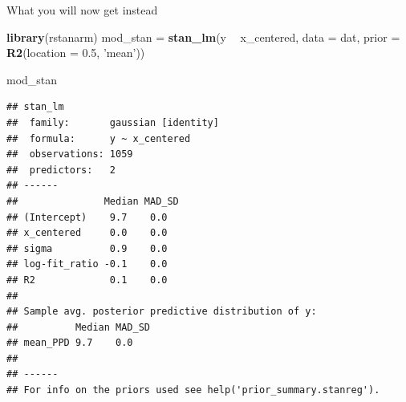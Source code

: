 \documentclass[ignorenonframetext,]{beamer}
\newenvironment{Shaded}{\begin{snugshade}}{\end{snugshade}}
\newcommand{\KeywordTok}[1]{\textcolor[rgb]{0.13,0.29,0.53}{\textbf{#1}}}
\newcommand{\DataTypeTok}[1]{\textcolor[rgb]{0.13,0.29,0.53}{#1}}
\newcommand{\FloatTok}[1]{\textcolor[rgb]{0.00,0.00,0.81}{#1}}
\newcommand{\StringTok}[1]{\textcolor[rgb]{0.31,0.60,0.02}{#1}}
\newcommand{\OperatorTok}[1]{\textcolor[rgb]{0.81,0.36,0.00}{\textbf{#1}}}
\newcommand{\NormalTok}[1]{#1}
\begin{document}
\begin{frame}[fragile]{What you will now get instead}

\tiny

\begin{Shaded}
\begin{Highlighting}[]
\KeywordTok{library}\NormalTok{(rstanarm)}
\NormalTok{mod_stan =}\StringTok{ }\KeywordTok{stan_lm}\NormalTok{(y }\OperatorTok{~}\StringTok{ }\NormalTok{x_centered, }\DataTypeTok{data =}\NormalTok{ dat,}
               \DataTypeTok{prior =} \KeywordTok{R2}\NormalTok{(}\DataTypeTok{location =} \FloatTok{0.5}\NormalTok{, }\StringTok{'mean'}\NormalTok{))}
\end{Highlighting}
\end{Shaded}

\begin{Shaded}
\begin{Highlighting}[]
\NormalTok{mod_stan}
\end{Highlighting}
\end{Shaded}

\begin{verbatim}
## stan_lm
##  family:       gaussian [identity]
##  formula:      y ~ x_centered
##  observations: 1059
##  predictors:   2
## ------
##               Median MAD_SD
## (Intercept)    9.7    0.0  
## x_centered     0.0    0.0  
## sigma          0.9    0.0  
## log-fit_ratio -0.1    0.0  
## R2             0.1    0.0  
## 
## Sample avg. posterior predictive distribution of y:
##          Median MAD_SD
## mean_PPD 9.7    0.0   
## 
## ------
## For info on the priors used see help('prior_summary.stanreg').
\end{verbatim}

\end{frame}
\end{document}
